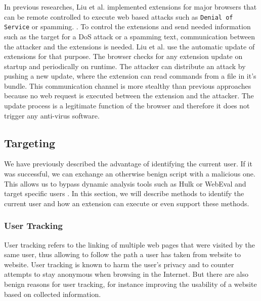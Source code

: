 		In previous researches, Liu et al. implemented extensions for major browsers that can be remote controlled to execute web based attacks such as \texttt{Denial of Service} or spamming. \cite{liu2011botnet, Liu12chromeextensions:}. To control the extensions and send needed information such as the target for a DoS attack or a spamming text, communication between the attacker and the extensions is needed. Liu et al. use the automatic update of extensions for that purpose. The browser checks for any extension update on startup and periodically on runtime. The attacker can distribute an attack by pushing a new update, where the extension can read commands from a file in it's bundle. This communication channel is more stealthy than previous approaches because no web request is executed between the extension and the attacker. The update process is a legitimate function of the browser and therefore it does not trigger any anti-virus software. \\		
		
	\subsection{Targeting}
	
		We have previously described the advantage of identifying the current user. If it was successful, we can exchange an otherwise benign script with a malicious one. This allows us to bypass dynamic analysis tools such as Hulk or WebEval and target specific users \cite{184485, 190984}. In this section, we will describe methods to identify the current user and how an extension can execute or even support these methods. 
		
		\subsubsection{User Tracking}
	
			User tracking refers to the linking of multiple web pages that were visited by the same user, thus allowing to follow the path a user has taken from website to website. User tracking is known to harm the user's privacy and to counter attempts to stay anonymous when browsing in the Internet. %
			But there are also benign reasons for user tracking, for instance improving the usability of a website based on collected information. \\ 
			

